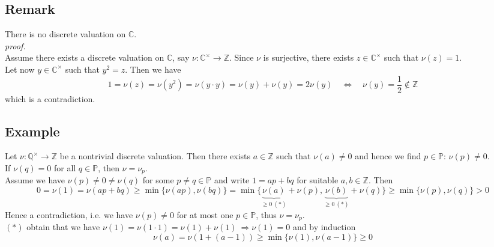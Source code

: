 \documentclass[12pt]{book}
\begin{document}
\begin{spacing}{1.3}
\subsection{Remark} %
There is no discrete valuation on $\mathbb{C}$.\\
\textit{proof.}\\
Assume there exists a discrete valuation on $\mathbb{C}$, say $\nu:\mathbb{C}^{\times} \longrightarrow \mathbb{Z}$. Since $\nu$ is surjective, there exists $z \in \mathbb{C}^{\times}$ such that $\nu(z)=1$.\\
Let now $y \in \mathbb{C}^{\times}$ such that $y^2=z$. Then we have
$$1= \nu(z)=\nu(y^2)= \nu(y \cdot y)= \nu(y)+\nu(y)=2 \nu(y) \quad \Longleftrightarrow \quad \nu(y)=\frac{1}{2} \notin \mathbb{Z}$$
which is a contradiction.

\subsection{Example} %
Let $\nu: \mathbb{Q}^{\times} \longrightarrow \mathbb{Z}$ be a nontrivial discrete valuation. Then there exists $a \in \mathbb{Z}$ such that $\nu(a)\neq 0$ and hence we find $p \in \mathbb{P}$: $\nu(p) \neq 0$.\\
If $\nu(q)=0$ for all $q \in \mathbb{P}$, then $\nu=\nu_p$.\\
Assume we have $\nu(p) \neq 0 \neq \nu(q)$ for some $p \neq q \in \mathbb{P}$ and write $1=ap+bq$ for suitable $a,b \in \mathbb{Z}$. Then 
$$0=\nu(1) = \nu(ap+bq) \geqslant \min\{\nu(ap), \nu(bq)\}
= \min\{\underbrace{\nu(a)}_{\geqslant 0 \ (*)} + \nu(p), \underbrace{\nu(b)}_{\geqslant 0 \ (*)} + \nu(q) \} \geqslant \min\{\nu(p), \nu(q)\} > 0$$
Hence a contradiction, i.e. we have $\nu(p) \neq 0$ for at most one $p \in \mathbb{P}$, thus $\nu=\nu_p$. \\
$(*)$ obtain that we have $\nu(1)=\nu(1 \cdot 1 )=\nu(1)+\nu(1) \ \Rightarrow \nu(1)=0$ and by induction $$\nu(a)=\nu(1+(a-1))\geqslant \min\{\nu(1), \nu(a-1)\} \geqslant 0$$


\end{spacing}
\end{document}

